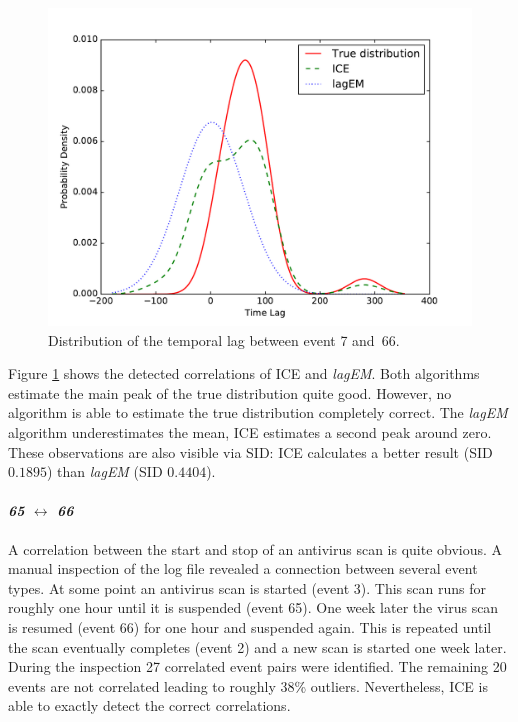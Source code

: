 \documentclass[conference]{IEEEtran}
\theoremstyle{examplestyle}
\begin{document}
\begin{figure}[!tb]
	\centering
	\includegraphics[scale=0.4]{images/symantec/7-66.pdf}
	\caption{Distribution of the temporal lag between event 7 and~66.}
	\label{fig:7-66}
\end{figure}

Figure \ref{fig:7-66} shows the detected correlations of \ac{ICE} and \textit{lagEM}. Both algorithms estimate the main peak of the true distribution quite good. However, no algorithm is able to estimate the true distribution completely correct. The \textit{lagEM} algorithm underestimates the mean, \ac{ICE} estimates a second peak around zero. These observations are also visible via \ac{SID}: \ac{ICE} calculates a better result (\ac{SID} $0.1895$) than \textit{lagEM} (\ac{SID} $0.4404$).




\paragraph{\textit{65} \(\leftrightarrow\) \textit{66}} A correlation between the start and stop of an antivirus scan is quite obvious. A manual inspection of the log file revealed a connection between several event types. At some point an antivirus scan is started (event 3). This scan runs for roughly one hour until it is suspended (event 65). One week later the virus scan is resumed (event 66) for one hour and suspended again. This is repeated until the scan eventually completes (event 2) and a new scan is started one week later. During the inspection 27 correlated event pairs were identified. The remaining 20 events are not correlated leading to roughly 38\% outliers. Nevertheless, \ac{ICE} is able to exactly detect the correct correlations.
\end{document}
